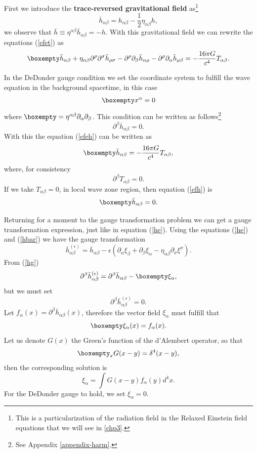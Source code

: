 First we introduce the \textbf{trace-reversed gravitational field
}as\footnote{This is a particularization of the radiation field in the Relaxed
Einstein field equations that we will see in \ref{chp3}.}
\begin{equation}
\overline{h}_{\alpha\beta}=h_{\alpha\beta}-\frac{1}{2}\eta_{\alpha\beta}h,\label{hbar}
\end{equation}
we observe that $\bar{h}\equiv\eta^{\alpha\beta}\bar{h}_{\alpha\beta}=-h$.
With this gravitational field we can rewrite the equations (\ref{efet})
as
\begin{equation}
\boxempty\bar{h}_{\alpha\beta}+\eta_{\alpha\beta}\partial^{\rho}\partial^{\sigma}\bar{h}_{\rho\sigma}-\partial^{\rho}\partial_{\beta}\bar{h}_{\alpha\rho}-\partial^{\rho}\partial_{\alpha}\bar{h}_{\rho\beta}=-\frac{16\pi G}{c^{4}}T_{\alpha\beta}.\label{efeh}
\end{equation}

In the DeDonder gauge condition we set the coordinate system to fulfill
the wave equation in the background spacetime, in this case
\[
\boxempty x^{\alpha}=0
\]
where $\boxempty=\eta^{\alpha\beta}\partial_{\alpha}\partial_{\beta}$.
This condition can be written as follows\footnote{See Appendix \ref{appendix-harm}.}
\begin{equation}
\partial^{\beta}\overline{h}_{\alpha\beta}=0.\label{hg}
\end{equation}
With this the equation (\ref{efeh}) can be written as
\begin{equation}
\boxempty\bar{h}_{\alpha\beta}=-\frac{16\pi G}{c^{4}}T_{\alpha\beta},\label{efh}
\end{equation}
where, for consistency 
\[
\partial^{\beta}T_{\alpha\beta}=0.
\]
If we take $T_{\alpha\beta}=0$, in local wave zone region, then equation
(\ref{efh}) is
\[
\boxempty\bar{h}_{\alpha\beta}=0.
\]

Returning for a moment to the gauge transformation problem we can
get a gauge transformation expression, just like in equation (\ref{he}).
Using the equations (\ref{he}) and (\ref{hbar}) we have the gauge
transformation
\[
\bar{h}_{\alpha\beta}^{(\epsilon)}=\bar{h}_{\alpha\beta}-\epsilon\left(\partial_{\alpha}\xi_{\beta}+\partial_{\beta}\xi_{\alpha}-\eta_{\alpha\beta}\partial_{\sigma}\xi^{\sigma}\right).
\]
From (\ref{hg})
\[
\partial^{\beta}\bar{h}_{\alpha\beta}^{(\epsilon)}=\partial^{\beta}\bar{h}_{\alpha\beta}-\boxempty\xi_{\alpha},
\]
but we must set
\[
\partial^{\beta}\bar{h}_{\alpha\beta}^{(\epsilon)}=0.
\]
Let $f_{\alpha}(x)=\partial^{\beta}\bar{h}_{\alpha\beta}(x)$, therefore
the vector field $\xi_{\alpha}$ must fulfill that 
\[
\boxempty\xi_{\alpha}(x)=f_{\alpha}(x).
\]
Let us denote $G(x)$ the Green's function of the d'Alembert operator,
so that
\[
\boxempty_{x}G(x-y)=\delta^{4}(x-y),
\]
then the corresponding solution is
\[
\xi_{\alpha}=\int G(x-y)f_{\alpha}(y)d^{4}x.
\]
For the DeDonder gauge to hold, we set $\xi_{\alpha}=0$.

